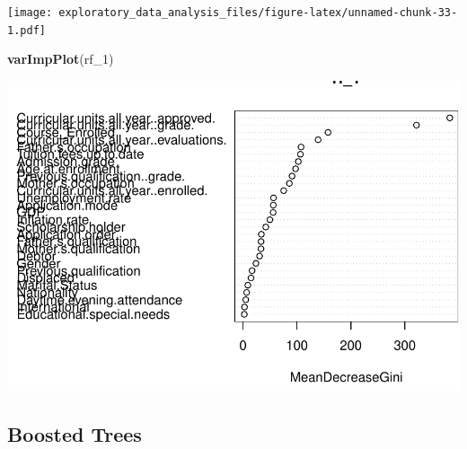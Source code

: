 \documentclass[
]{article}
\newenvironment{Shaded}{\begin{snugshade}}{\end{snugshade}}
\newcommand{\FunctionTok}[1]{\textcolor[rgb]{0.13,0.29,0.53}{\textbf{#1}}}
\newcommand{\NormalTok}[1]{#1}
\begin{document}
\texttt{[image: exploratory\_data\_analysis\_files/figure-latex/unnamed-chunk-33-1.pdf]}

\begin{Shaded}
\begin{Highlighting}[]
\FunctionTok{varImpPlot}\NormalTok{(rf\_1)}
\end{Highlighting}
\end{Shaded}

\includegraphics{exploratory_data_analysis_files/figure-latex/unnamed-chunk-34-1.pdf}

\hypertarget{boosted-trees}{%
\subsection{Boosted Trees}\label{boosted-trees}}
\end{document}
